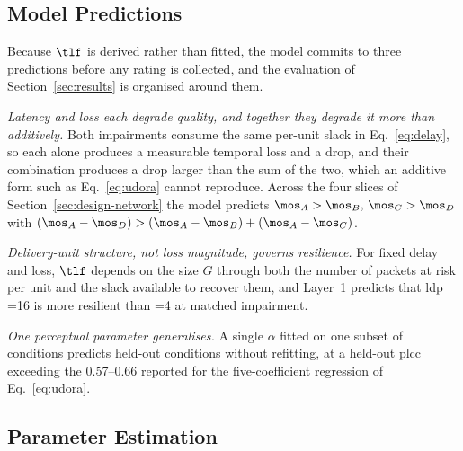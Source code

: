 \subsection{Model Predictions}
\label{sec:model-predictions}
Because $\tlf$ is derived rather than fitted, the model commits to
three predictions before any rating is collected, and the evaluation of
Section~\ref{sec:results} is organised around them.

\emph{Latency and loss each degrade quality, and together they
degrade it more than additively.} Both impairments consume the same
per-unit slack in Eq.~\eqref{eq:delay}, so each alone produces a
measurable temporal loss and a \mos drop, and their combination
produces a drop larger than the sum of the two, which an additive form
such as Eq.~\eqref{eq:udora} cannot reproduce. Across the four slices
of Section~\ref{sec:design-network} the model predicts
$\mos_A > \mos_B,\, \mos_C > \mos_D$ with
$(\mos_A - \mos_D) > (\mos_A - \mos_B) + (\mos_A - \mos_C)$.

\emph{Delivery-unit structure, not loss magnitude, governs
resilience.} For fixed delay and loss, $\tlf$ depends on the \gof size
$G$ through both the number of packets at risk per unit and the slack
available to recover them, and Layer~1 predicts that \gls{ldp}
\gof{}=16 is more resilient than \gof{}=4 at matched impairment.

\emph{One perceptual parameter generalises.} A single $\alpha$ fitted
on one subset of conditions predicts held-out conditions without
refitting, at a held-out \gls{plcc} exceeding the 0.57--0.66 reported
for the five-coefficient regression of Eq.~\eqref{eq:udora}.

\subsection{Parameter Estimation}
\label{sec:model-fit}

